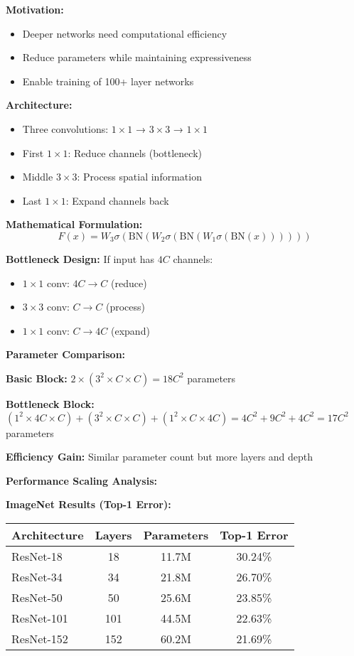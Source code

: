 \documentclass[12pt]{article}
\begin{document}
\begin{enumerate}[(a)]
{    \textbf{Motivation:}
    \begin{itemize}
        \item Deeper networks need computational efficiency
        \item Reduce parameters while maintaining expressiveness
        \item Enable training of 100+ layer networks
    \end{itemize}
    
    \textbf{Architecture:}
    \begin{itemize}
        \item Three convolutions: $1 \times 1$ → $3 \times 3$ → $1 \times 1$
        \item First $1 \times 1$: Reduce channels (bottleneck)
        \item Middle $3 \times 3$: Process spatial information
        \item Last $1 \times 1$: Expand channels back
    \end{itemize}
    
    \textbf{Mathematical Formulation:}
    $$F(x) = W_3 \sigma(\text{BN}(W_2 \sigma(\text{BN}(W_1 \sigma(\text{BN}(x))))))$$
    
    \textbf{Bottleneck Design:}
    If input has $4C$ channels:
    \begin{itemize}
        \item $1 \times 1$ conv: $4C \rightarrow C$ (reduce)
        \item $3 \times 3$ conv: $C \rightarrow C$ (process)
        \item $1 \times 1$ conv: $C \rightarrow 4C$ (expand)
    \end{itemize}
    
    \textbf{Parameter Comparison:}
    
    \textbf{Basic Block:} $2 \times (3^2 \times C \times C) = 18C^2$ parameters
    
    \textbf{Bottleneck Block:} $(1^2 \times 4C \times C) + (3^2 \times C \times C) + (1^2 \times C \times 4C) = 4C^2 + 9C^2 + 4C^2 = 17C^2$ parameters
    
    \textbf{Efficiency Gain:} Similar parameter count but more layers and depth
    
    \textbf{Performance Scaling Analysis:}
    
    \textbf{ImageNet Results (Top-1 Error):}
    \begin{center}
    \begin{tabular}{|l|c|c|c|}
    \hline
    Architecture & Layers & Parameters & Top-1 Error \\
    \hline
    ResNet-18 & 18 & 11.7M & 30.24\% \\
    ResNet-34 & 34 & 21.8M & 26.70\% \\
    ResNet-50 & 50 & 25.6M & 23.85\% \\
    ResNet-101 & 101 & 44.5M & 22.63\% \\
    ResNet-152 & 152 & 60.2M & 21.69\% \\
    \hline
    \end{tabular}
    \end{center}
    
}
\end{enumerate}
\end{document}
